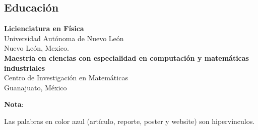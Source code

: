\documentclass[a3paper]{adcv_color}
\begin{document}
\begin{multicols}{2}
      \section{Educación}

      \textbf{Licienciatura en Física} \\
      Universidad Autónoma de Nuevo León\\
      Nuevo León, Mexico.\\

      \textbf{Maestria en ciencias con especialidad en computación y matemáticas industriales}\\
      Centro de Investigación en Matemáticas\\
      Guanajuato, México
      \begin{flushright}
        \changefontsizes{10pt}
        \textbf{Nota}:

        Las palabras en color azul (artículo, reporte, poster y website) son hipervinculos.
      \end{flushright}
    \end{multicols}
    
\end{document}
